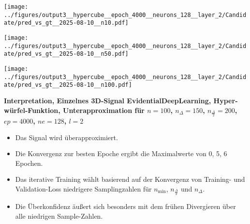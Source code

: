 \begin{otherlanguage}{ngerman}
\begin{samepage}
\begin{minipage}{\textwidth}
\begin{minipage}{0.05\textwidth}
    \centering{}
\end{minipage}%
\begin{minipage}{0.3\textwidth}
    \centering
    \texttt{[image: ../figures/output3\_\_hypercube\_\_epoch\_4000\_\_neurons\_128\_\_layer\_2/Candidate/pred\_vs\_gt\_\_2025-08-10\_\_n10.pdf]}
\end{minipage}%
\begin{minipage}{0.3\textwidth}
    \centering
    \texttt{[image: ../figures/output3\_\_hypercube\_\_epoch\_4000\_\_neurons\_128\_\_layer\_2/Candidate/pred\_vs\_gt\_\_2025-08-10\_\_n50.pdf]}
\end{minipage}%
\begin{minipage}{0.3\textwidth}
    \centering
    \texttt{[image: ../figures/output3\_\_hypercube\_\_epoch\_4000\_\_neurons\_128\_\_layer\_2/Candidate/pred\_vs\_gt\_\_2025-08-10\_\_n100.pdf]}
\end{minipage}

\label{fig:pred_vs_gt_matrix}

\end{minipage}
\end{samepage}


\clearpage

\begin{samepage}
\begin{minipage}{\textwidth}

\noindent\textbf{Interpretation, Einzelnes 3D-Signal \gls{EvidentialDeepLearning}, Hyperwürfel-Funktion,
Unterapproximation für $n=100$, $n_{\Delta}=150$, $n_{\frac{\Delta}{2}}=200$, $ep=4000$, $ne=128$, $l=2$}

\begin{itemize}
    \item Das Signal wird überapproximiert.
    \item Die Konvergenz zur besten Epoche ergibt die Maximalwerte von 0, 5, 6 Epochen.
    \item Das iterative Training wählt basierend auf der Konvergenz von Training- und Validation-Loss niedrigere Samplingzahlen für $n_{\min}$, $n_{\frac{\Delta}{2}}$ und $n_{\Delta}$.
    \item Die Überkonfidenz äußert sich besonders mit dem frühen Divergieren über alle niedrigen Sample-Zahlen.
\end{itemize}





\end{minipage}
\end{samepage}
\end{otherlanguage}
